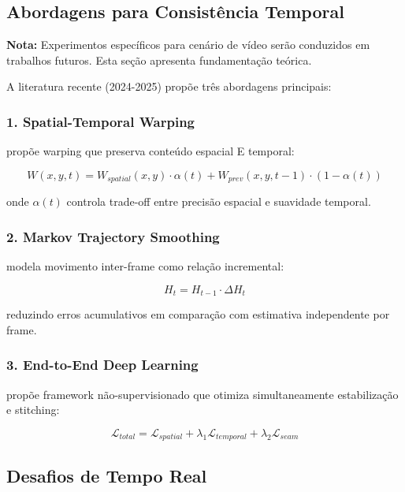 \subsection{Abordagens para Consistência Temporal}

\textbf{Nota:} Experimentos específicos para cenário de vídeo serão conduzidos em trabalhos futuros. Esta seção apresenta fundamentação teórica.

A literatura recente (2024-2025) propõe três abordagens principais:

\subsubsection{1. Spatial-Temporal Warping}

\cite{Jiang2015} propõe warping que preserva conteúdo espacial E temporal:

\begin{equation}
W(x,y,t) = W_{spatial}(x,y) \cdot \alpha(t) + W_{prev}(x,y,t-1) \cdot (1-\alpha(t))
\end{equation}

onde $\alpha(t)$ controla trade-off entre precisão espacial e suavidade temporal.

\subsubsection{2. Markov Trajectory Smoothing}

\cite{Lin2025} modela movimento inter-frame como relação incremental:

\begin{equation}
H_t = H_{t-1} \cdot \Delta H_t
\end{equation}

reduzindo erros acumulativos em comparação com estimativa independente por frame.

\subsubsection{3. End-to-End Deep Learning}

\cite{Chen2025} propõe framework não-supervisionado que otimiza simultaneamente estabilização e stitching:

\begin{equation}
\mathcal{L}_{total} = \mathcal{L}_{spatial} + \lambda_1 \mathcal{L}_{temporal} + \lambda_2 \mathcal{L}_{seam}
\end{equation}

\subsection{Desafios de Tempo Real}

